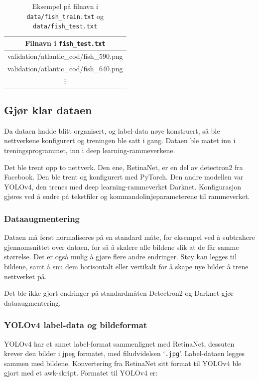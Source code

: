 \begin{table}[b]
\bigskip
\centering
\caption{Eksempel på filnavn i \texttt{data/fish\_train.txt} og \texttt{data/fish\_test.txt}}
\label{tab:fish} 
\begin{tabular}[t]{c}
\toprule
Filnavn i \texttt{fish\_test.txt} \\
\midrule
validation/atlantic\_cod/fish\_590.png \\
validation/atlantic\_cod/fish\_640.png \\
\vdots \\
\bottomrule	
\end{tabular}
\end{table}

\subsection{Gjør klar dataen}

Da dataen hadde blitt organisert, og label-data nøye konstruert, så ble nettverkene konfigurert og treningen ble satt i gang. Dataen ble matet inn i treningsprogrammet, inn i deep learning-rammeverkene.

Det ble trent opp to nettverk. Den ene, RetinaNet, er en del av detectron2 fra Facebook. Den ble trent og konfigurert med PyTorch. Den andre modellen var YOLOv4, den trenes med deep learning-rammeverket Darknet. Konfigurasjon gjøres ved å endre på tekstfiler og kommandolinjeparameterene til rammeverket.

\subsubsection{Dataaugmentering}

Dataen må først normaliseres på en standard måte, for eksempel ved å subtrahere gjennomsnittet over dataen, for så å skalere alle bildene slik at de får samme størrelse. Det er også mulig å gjøre flere andre endringer. Støy kan legges til bildene, samt å snu dem horisontalt eller vertikalt for å skape nye bilder å trene nettverket på. \cite{Cadieu m.fl. 2014 s. 15}

Det ble ikke gjort endringer på standardmåten Detectron2 og Darknet gjør dataaugmentering.

\subsubsection{YOLOv4 label-data og bildeformat}

YOLOv4 har et annet label-format sammenlignet med RetinaNet, dessuten krever den bilder i jpeg formatet, med filudvidelsen `\texttt{.jpg}'. Label-dataen legges sammen med bildene. Konvertering fra RetinaNet sitt format til YOLOv4 ble gjort med et awk-skript. Formatet til YOLOv4 er:

